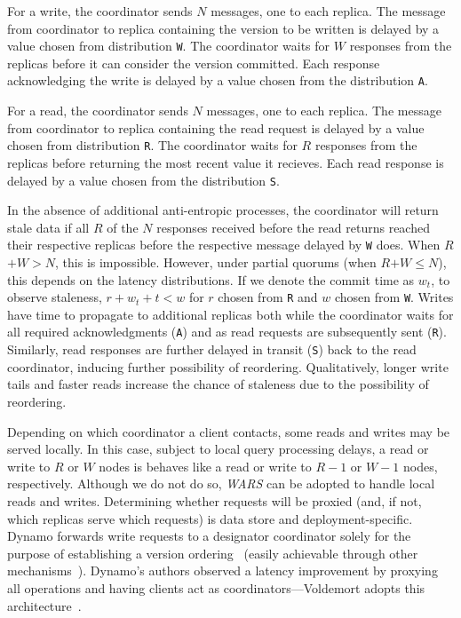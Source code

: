 \documentclass{vldb}
\begin{document}
For a write, the coordinator sends $N$ messages, one to each
replica. The message from coordinator to replica containing the
version to be written is delayed by a value chosen from distribution
\texttt{W}.  The coordinator waits for $W$ responses from the replicas
before it can consider the version committed.  Each response
acknowledging the write is delayed by a value chosen from the
distribution \texttt{A}.

For a read, the coordinator sends $N$ messages, one to each replica.
The message from coordinator to replica containing the read request is
delayed by a value chosen from distribution \texttt{R}.  The
coordinator waits for $R$ responses from the replicas before returning
the most recent value it recieves.  Each read response is delayed by a
value chosen from the distribution \texttt{S}.

In the absence of additional anti-entropic processes, the coordinator
will return stale data if all $R$ of the $N$ responses received before
the read returns reached their respective replicas before the
respective message delayed by \texttt{W} does.  When $R$$+$$W$$>$$N$,
this is impossible.  However, under partial quorums (when
$R$$+$$W$$\leq$$N$), this depends on the latency distributions.  If we
denote the commit time as $w_t$, to observe staleness, $r+w_t+t< w$ for
$r$ chosen from \texttt{R} and $w$ chosen from \texttt{W}.  Writes
have time to propagate to additional replicas both while the
coordinator waits for all required acknowledgments (\texttt{A}) and as
read requests are subsequently sent (\texttt{R}).  Similarly, read
responses are further delayed in transit (\texttt{S}) back to the read
coordinator, inducing further possibility of reordering.
Qualitatively, longer write tails and faster reads increase the chance
of staleness due to the possibility of reordering.

Depending on which coordinator a client contacts, some reads and
writes may be served locally.  In this case, subject to local query
processing delays, a read or write to $R$ or $W$ nodes is behaves like
a read or write to $R-1$ or $W-1$ nodes, respectively.  Although we do
not do so, \textit{WARS} can be adopted to handle local reads and
writes.  Determining whether requests will be proxied (and, if not,
which replicas serve which requests) is data store and
deployment-specific.  Dynamo forwards write requests to a designator
coordinator solely for the purpose of establishing a version
ordering~\cite[Section 6.4]{dynamo} (easily achievable through other
mechanisms~\cite{zookeeper}).  Dynamo's authors observed a latency
improvement by proxying all operations and having clients act as
coordinators---Voldemort adopts this architecture~\cite{voldemortclient}.
\end{document}
